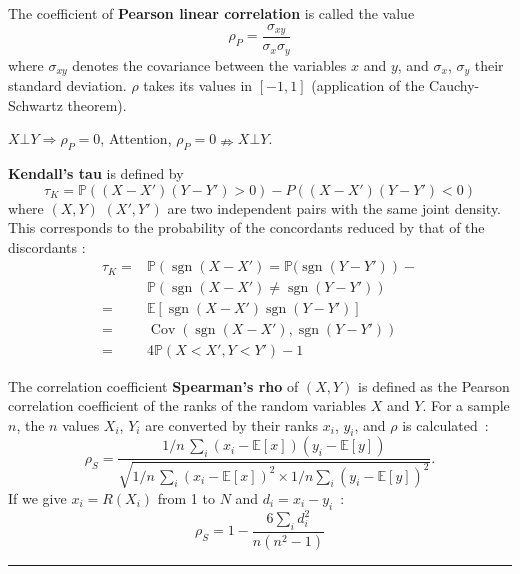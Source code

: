 \begin{f}

The coefficient of \textbf{Pearson linear correlation} is called the value
\[
\rho_P = \frac{\sigma_{xy}}{\sigma_x \sigma_y}
\]
where \(\sigma_{xy}\) denotes the covariance between the variables \(x\) and \(y\), and \(\sigma_x\), \(\sigma_y\) their standard deviation.
\(\rho\) takes its values in \([-1,1]\) (application of the Cauchy-Schwartz theorem).

\(X\bot Y \Rightarrow \rho_P=0\), Attention, \(\rho_P=0 \nRightarrow X\bot Y \). 


 

\textbf{Kendall's tau} is defined by
\[
\tau_K=\mathbb{P}((X-X')(Y-Y')>0)-P((X-X')(Y-Y')<0)
\]
where \((X,Y)\)  \((X',Y')\) are two independent pairs with the same joint density. This corresponds to the probability of the concordants reduced by that of the discordants :
\begin{align*}
\tau_K	=&\mathbb{P}\left(\operatorname{sgn}(X-X')=\mathbb{P}(\operatorname{sgn}(Y-Y')\right)-\\
		&\mathbb{P}\left(\operatorname{sgn}(X-X')\neq \operatorname{sgn}(Y-Y')\right)\\
=&\mathbb{E}\left[ \operatorname{sgn}(X-X')\operatorname{sgn}(Y-Y')\right]\\
=&\operatorname{Cov}(\operatorname{sgn}(X-X'),\operatorname{sgn}(Y-Y'))\\
=&4\mathbb{P}(X<X',Y<Y')-1 
\end{align*}

The correlation coefficient \textbf{Spearman's rho} of \((X,Y)\) is defined as the Pearson correlation coefficient of the ranks of the random variables \(X\) and \(Y\).
For a sample \(n\), the \(n\) values \(X_i\), \(Y_i\) are converted by their ranks \(x_i\), \(y_i\), and \(\rho\) is calculated~:
\[
\rho_S = \frac{1/n\,\sum_i(x_i-\mathbb{E}[x])(y_i-\mathbb{E}[y])}{\sqrt{1/n\,\sum_i (x_i-\mathbb{E}[x])^2 \times 1/n\sum_i(y_i-\mathbb{E}[y])^2}}.
\]
If we give \(x_i= R(X_i)\) from 1 to \(N\) and \(d_i = x_i - y_i\)~:
\[    \rho_S = 1- {\frac {6 \sum_i d_i^2}{n(n^2 - 1)}}\]

\end{f}
\hrule

